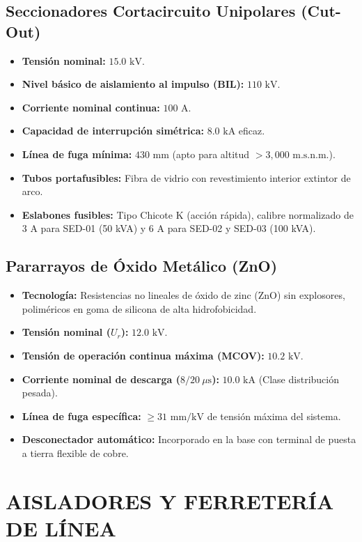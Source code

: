 \subsection{Seccionadores Cortacircuito Unipolares (Cut-Out)}
\begin{itemize}
  \item \textbf{Tensión nominal:} $15.0\text{ kV}$.
  \item \textbf{Nivel básico de aislamiento al impulso (BIL):} $110\text{ kV}$.
  \item \textbf{Corriente nominal continua:} $100\text{ A}$.
  \item \textbf{Capacidad de interrupción simétrica:} $8.0\text{ kA}$ eficaz.
  \item \textbf{Línea de fuga mínima:} $430\text{ mm}$ (apto para altitud $> 3,000\text{ m.s.n.m.}$).
  \item \textbf{Tubos portafusibles:} Fibra de vidrio con revestimiento interior extintor de arco.
  \item \textbf{Eslabones fusibles:} Tipo Chicote K (acción rápida), calibre normalizado de $3\text{ A}$ para SED-01 (50 kVA) y $6\text{ A}$ para SED-02 y SED-03 (100 kVA).
\end{itemize}

\subsection{Pararrayos de Óxido Metálico (ZnO)}
\begin{itemize}
  \item \textbf{Tecnología:} Resistencias no lineales de óxido de zinc (ZnO) sin explosores, poliméricos en goma de silicona de alta hidrofobicidad.
  \item \textbf{Tensión nominal ($U_r$):} $12.0\text{ kV}$.
  \item \textbf{Tensión de operación continua máxima (MCOV):} $10.2\text{ kV}$.
  \item \textbf{Corriente nominal de descarga ($8/20\ \mu\text{s}$):} $10.0\text{ kA}$ (Clase distribución pesada).
  \item \textbf{Línea de fuga específica:} $\ge 31\text{ mm/kV}$ de tensión máxima del sistema.
  \item \textbf{Desconectador automático:} Incorporado en la base con terminal de puesta a tierra flexible de cobre.
\end{itemize}

\section{AISLADORES Y FERRETERÍA DE LÍNEA}

